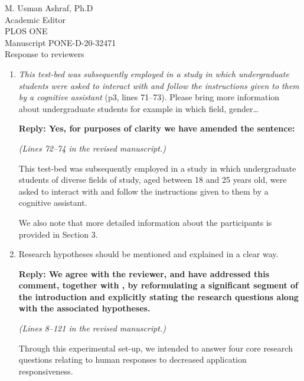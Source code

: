 \documentclass[10pt, letterpaper]{letter}
\newenvironment{QandA}
{\begin{enumerate}[
    label={\bfseries Comment \arabic*:}, 
    wide,
    ref={Comment \arabic*}]}
{\end{enumerate}}
\newenvironment{revised}[2]
{%
\begin{displayquote}
    \medskip
    \begin{flushright}
        \itshape{(Lines \numrange{#1}{#2} in the revised manuscript.)}\normalfont%
    \end{flushright}
    \medskip

}
{\end{displayquote}}
\newenvironment{answered}
{\medskip\par\bfseries Reply: \normalfont}
{\par\noindent\makebox[\linewidth]{\rule{\textwidth}{0.4pt}}\bigskip}
\begin{document}
\begin{letter}{
    M. Usman Ashraf, Ph.D\\
    Academic Editor\\
    PLOS ONE\\
    \medskip
    Manuscript PONE-D-20-32471\\
    Response to reviewers\\
}
\begin{QandA}
    \begin{answered}
        We accept that the sentence is unclear and strange.
        In the revised manuscript it has been changed to:

        \begin{revised}{71}{72}
            We present in this paper the design and elaboration of an experimental WCA test-bed.
        \end{revised}
    \end{answered}

    \item \emph{This test-bed was subsequently employed in a study in which undergraduate students were asked to interact with and follow the instructions given to them by a cognitive assistant} (p3, lines 71--73).
    Please bring more information about undergraduate students for example in which field, gender\ldots

    \begin{answered}
        Yes, for purposes of clarity we have amended the sentence:

        \begin{revised}{72}{74}
            This test-bed was subsequently employed in a study in which undergraduate students of diverse fields of study, aged between 18 and 25 years old, were asked to interact with and follow the instructions given to them by a cognitive assistant.
        \end{revised}

        We also note that more detailed information about the participants is provided in Section 3.
    \end{answered}


    \item\label{it:hypothesis} Research hypotheses should be mentioned and explained in a clear way.
    
    \begin{answered}
        We agree with the reviewer, and have addressed this comment, together with , by reformulating a significant segment of the introduction and explicitly stating the research questions along with the associated hypotheses.
    
        \begin{revised}{8}{121}
            Through this experimental set-up, we intended to answer four core research questions relating to human responses to decreased application responsiveness.\\


\end{revised}
\end{answered}
\end{QandA}
\end{letter}
\end{document}
